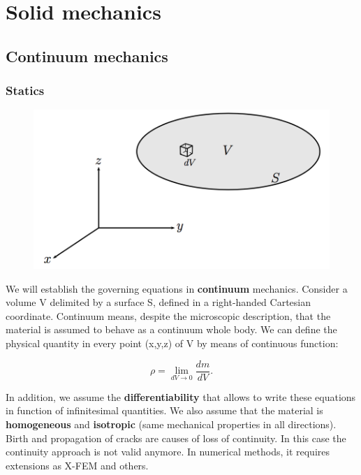 
\chapter{Solid mechanics}
	\section{Continuum mechanics}
		\subsection{Statics}
		
		\begin{figure}
		\vspace{-5mm}	
		\includegraphics[scale=0.3]{ch3/1}
		\end{figure}		
		We will establish the governing equations in \textbf{continuum} mechanics. Consider a volume V delimited by a surface S, defined in a right-handed Cartesian coordinate. Continuum means, despite the microscopic description, that the material is assumed to behave as a continuum whole body. We can define the physical quantity in every point (x,y,z) of V by means of continuous function:
		
		\begin{equation}
		\rho = \lim _{dV\rightarrow 0} \frac{dm}{dV}.
		\end{equation}
		
		In addition, we assume the \textbf{differentiability} that allows to write these equations in function of infinitesimal quantities. We also assume that the material is \textbf{homogeneous} and \textbf{isotropic} (same mechanical properties in all directions). Birth and propagation of cracks are causes of loss of continuity. In this case the continuity approach is not valid anymore. In numerical methods, it requires extensions as X-FEM and others. \\
		
